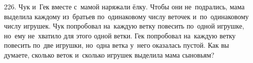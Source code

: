 226. Чук и Гек вместе с мамой наряжали ёлку. Чтобы они не подрались, мама выделила каждому из братьев по одинаковому числу веточек и по одинаковому числу игрушек. Чук попробовал на каждую ветку повесить по одной игрушке, но ему не хватило для этого одной ветки. Гек попробовал на каждую ветку повесить по две игрушки, но одна ветка у него оказалась пустой. Как вы думаете, сколько веток и сколько игрушек выделила мама сыновьям?\\
